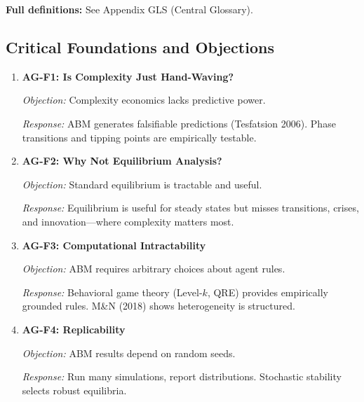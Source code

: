 \textbf{Full definitions:} See Appendix GLS (Central Glossary).

\subsection{Critical Foundations and Objections}
\label{sec:ag-foundations}


\begin{enumerate}
    \item \textbf{AG-F1: Is Complexity Just Hand-Waving?}

    \textit{Objection:} Complexity economics lacks predictive power.

    \textit{Response:} ABM generates falsifiable predictions (Tesfatsion 2006).
    Phase transitions and tipping points are empirically testable.

    \item \textbf{AG-F2: Why Not Equilibrium Analysis?}

    \textit{Objection:} Standard equilibrium is tractable and useful.

    \textit{Response:} Equilibrium is useful for steady states but misses
    transitions, crises, and innovation---where complexity matters most.

    \item \textbf{AG-F3: Computational Intractability}

    \textit{Objection:} ABM requires arbitrary choices about agent rules.

    \textit{Response:} Behavioral game theory (Level-$k$, QRE) provides
    empirically grounded rules. M\&N (2018) shows heterogeneity is structured.

    \item \textbf{AG-F4: Replicability}

    \textit{Objection:} ABM results depend on random seeds.

    \textit{Response:} Run many simulations, report distributions. Stochastic
    stability selects robust equilibria.
\end{enumerate}

